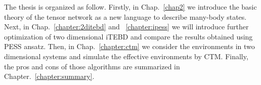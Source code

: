 The thesis is organized as follow. Firstly, in Chap.~\ref{chap2} we introduce the basic theory of the tensor network as a new language to describe many-body states. Next, in Chap.~\ref{chapter:2ditebd} and ~\ref{chapter:ipess} we will introduce further optimization of two dimensional iTEBD and compare the results obtained using PESS ansatz. Then, in Chap.~\ref{chapter:ctm} we consider the environments in two dimensional systems and simulate the effective environments by CTM. Finally, the pros and cons of those algorithms are summarized in Chapter.~\ref{chapter:summary}.

